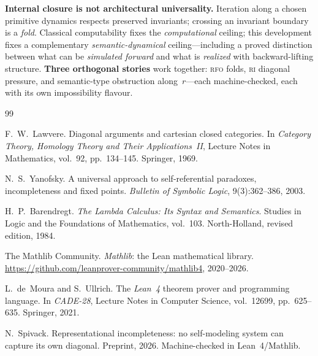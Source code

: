 \documentclass[11pt]{article}
\theoremstyle{plain}
\theoremstyle{definition}
\theoremstyle{remark}
\newcommand{\RFO}{\textsc{rfo}}
\newcommand{\RI}{\textsc{ri}}
\begin{document}
\begin{keybox}[title={Closing moral}]
\textbf{Internal closure is not architectural universality.}  Iteration along a chosen
primitive dynamics respects preserved invariants; crossing an invariant boundary is a
\emph{fold}.  Classical computability fixes the \emph{computational} ceiling; this
development fixes a complementary \emph{semantic-dynamical} ceiling---including a proved
distinction between what can be \emph{simulated forward} and what is \emph{realized} with
backward-lifting structure.  \textbf{Three orthogonal stories} work together: \RFO{} folds,
\RI{} diagonal pressure, and semantic-type obstruction along~$r$---each machine-checked,
each with its own impossibility flavour.
\end{keybox}

\begin{thebibliography}{99}

F.~W.~Lawvere.
\newblock Diagonal arguments and cartesian closed categories.
\newblock In \emph{Category Theory, Homology Theory and Their Applications~II},
  Lecture Notes in Mathematics, vol.~92, pp.~134--145. Springer, 1969.

N.~S.~Yanofsky.
\newblock A universal approach to self-referential paradoxes, incompleteness and
  fixed points.
\newblock \emph{Bulletin of Symbolic Logic}, 9(3):362--386, 2003.

H.~P.~Barendregt.
\newblock \emph{The Lambda Calculus: Its Syntax and Semantics}.
\newblock Studies in Logic and the Foundations of Mathematics, vol.~103.
  North-Holland, revised edition, 1984.

The Mathlib Community.
\newblock \emph{Mathlib}: the Lean mathematical library.
\newblock \url{https://github.com/leanprover-community/mathlib4}, 2020--2026.

L.~de~Moura and S.~Ullrich.
\newblock The \emph{Lean~4} theorem prover and programming language.
\newblock In \emph{CADE-28}, Lecture Notes in Computer Science, vol.~12699,
  pp.~625--635. Springer, 2021.

N.~Spivack.
\newblock Representational incompleteness: no self-modeling system can capture its own
  diagonal.
\newblock Preprint, 2026.
\newblock Machine-checked in Lean~4/Mathlib.

\end{thebibliography}
\end{document}
